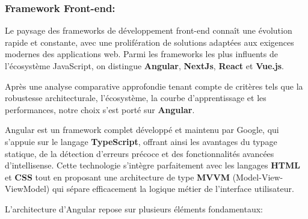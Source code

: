 \subsubsection{Framework Front-end:}
 Le paysage des frameworks de développement front-end connaît une évolution rapide et constante, avec une prolifération de solutions adaptées aux exigences modernes des applications web. Parmi les frameworks les plus influents de l'écosystème JavaScript, on distingue \textbf{Angular}\cite{b10}, \textbf{NextJs}\cite{b11}, \textbf{React}\cite{b12} et \textbf{Vue.js}\cite{b13}.

 Après une analyse comparative approfondie tenant compte de critères tels que la robustesse architecturale, l'écosystème, la courbe d'apprentissage et les performances, notre choix s'est porté sur \textbf{Angular}.

 Angular est un framework complet développé et maintenu par Google, qui s'appuie sur le langage \textbf{TypeScript}, offrant ainsi les avantages du typage statique, de la détection d'erreurs précoce et des fonctionnalités avancées d'intellisense. Cette technologie s'intègre parfaitement avec les langages \textbf{HTML} et \textbf{CSS} tout en proposant une architecture de type \textbf{MVVM} (Model-View-ViewModel) qui sépare efficacement la logique métier de l'interface utilisateur.



 L'architecture d'Angular repose sur plusieurs éléments fondamentaux:

